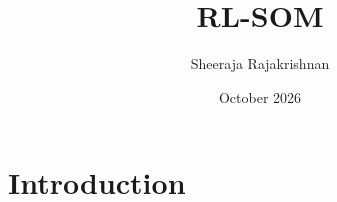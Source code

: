 \documentclass{article}
\title{RL-SOM}
\author{Sheeraja Rajakrishnan}
\date{October 2026}
\begin{document}
\maketitle

\section{Introduction}
\end{document}
